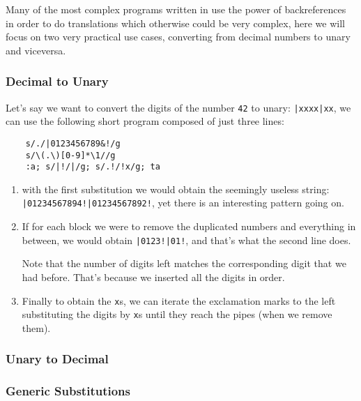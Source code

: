 Many of the most complex programs written in \sed use the power of
backreferences in order to do translations which otherwise could be very
complex, here we will focus on two very practical use cases, converting from
decimal numbers to unary and viceversa.

\subsubsection{Decimal to Unary}

Let's say we want to convert the digits of the number {\tt 42} to unary:
{\tt |xxxx|xx}, we can use the following short program composed of just three
lines:

\begin{Verbatim}
	s/./|0123456789&!/g
	s/\(.\)[0-9]*\1//g
	:a; s/|!/|/g; s/.!/!x/g; ta
\end{Verbatim}

\begin{enumerate}
	\item with the first substitution we would obtain the seemingly useless
		string: {\tt |01234567894!|01234567892!}, yet there is an interesting
		pattern going on.
	\item If for each block we were to remove the duplicated numbers and
		everything in between, we would obtain {\tt |0123!|01!}, and that's
		what the second line does.

		Note that the number of digits left matches the corresponding digit
		that we had before.  That's because we inserted all the digits in order.

	\item Finally to obtain the {\tt x}s, we can iterate the exclamation marks
		to the left substituting the digits by {\tt x}s until they reach the
		pipes (when we remove them).
\end{enumerate}

\subsubsection{Unary to Decimal}

\subsubsection{Generic Substitutions}

